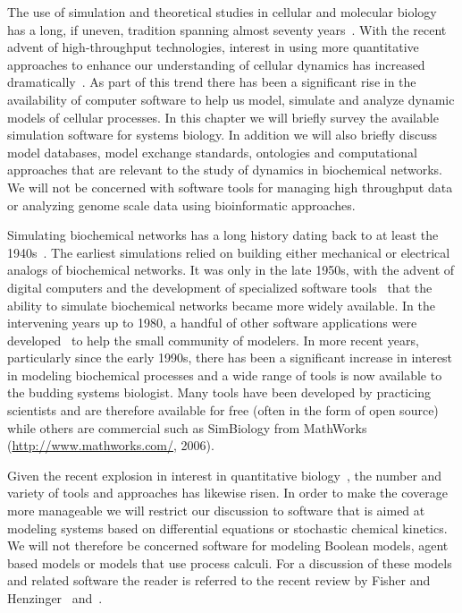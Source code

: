 \documentclass[12pt]{article}
\begin{document}
The use of simulation and theoretical studies in cellular and
molecular biology has a long, if uneven, tradition spanning almost
seventy years~\citep{Wright1934}. With the recent advent of
high-throughput technologies, interest in using more quantitative
approaches to enhance our understanding of cellular dynamics has
increased dramatically~\citep{TysonNatReview2001,neves:2002,GevaZatorsky:2006,Kholodenko:2006}.
As part of this trend there has been a significant rise in the availability of computer
software to help us model, simulate and analyze dynamic models of
cellular processes. In this chapter we will briefly survey the
available simulation software for systems biology. In addition we
will also briefly discuss model databases, model exchange standards,
ontologies and computational approaches that are relevant to the
study of dynamics in biochemical networks. We will not be concerned with software tools for managing high throughput data or analyzing genome scale data using bioinformatic approaches.


Simulating biochemical networks has a long history dating back to at
least the 1940s~\citep{chance:1943}. The earliest simulations relied on
building either mechanical or electrical analogs of biochemical
networks. It was only in the late 1950s, with the advent of digital
computers and the development of specialized software tools~\citep{Ga68} that the ability to simulate biochemical networks became more widely available. In the intervening years up to 1980, a
handful of other software applications were developed~\citep{Burns1969,Bu71,PW73}
to help the small community of modelers. In more recent years, particularly
since the early 1990s, there has been a significant increase in interest in
modeling biochemical processes and a wide range of tools is now
available to the budding systems biologist. Many tools have been
developed by practicing scientists and are therefore available for
free (often in the form of open source) while others are commercial
such as SimBiology from MathWorks (\url{http://www.mathworks.com/}, 2006).

Given the recent explosion in interest in quantitative
biology~\citep{Klipp:2005,AlonBook}, the number and variety of tools and
approaches has likewise risen. In order to make the coverage more
manageable we will restrict our discussion to software that is aimed
at modeling systems based on differential equations or stochastic
chemical kinetics. We will not therefore be concerned software for modeling Boolean models, agent based models or models that use process calculi. For a discussion of
these models and related software the reader is referred to the
recent review by Fisher and Henzinger~\citep{Fisher2007} and~\cite{Degenring:2004}.
\end{document}
